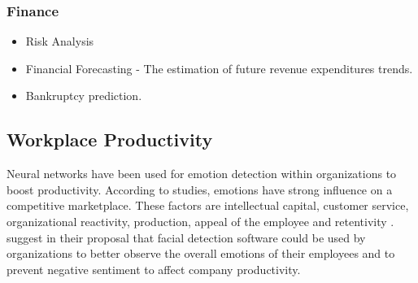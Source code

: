 \subsubsection*{Finance}
\begin{itemize}
	\item Risk Analysis
	\item Financial Forecasting - The estimation of future revenue expenditures trends.
	\item Bankruptcy prediction. 
\end{itemize}

\subsection*{Workplace Productivity}
Neural networks have been used for emotion detection within organizations to boost productivity. According to studies, emotions have strong influence on a competitive marketplace. These factors are intellectual capital, customer service, organizational reactivity, production, appeal of the employee and retentivity \citep{empdetect}. \citeauthor{empdetect} suggest in their proposal that facial detection software could be used by organizations to better observe the overall emotions of their employees and to prevent negative sentiment to affect company productivity.

